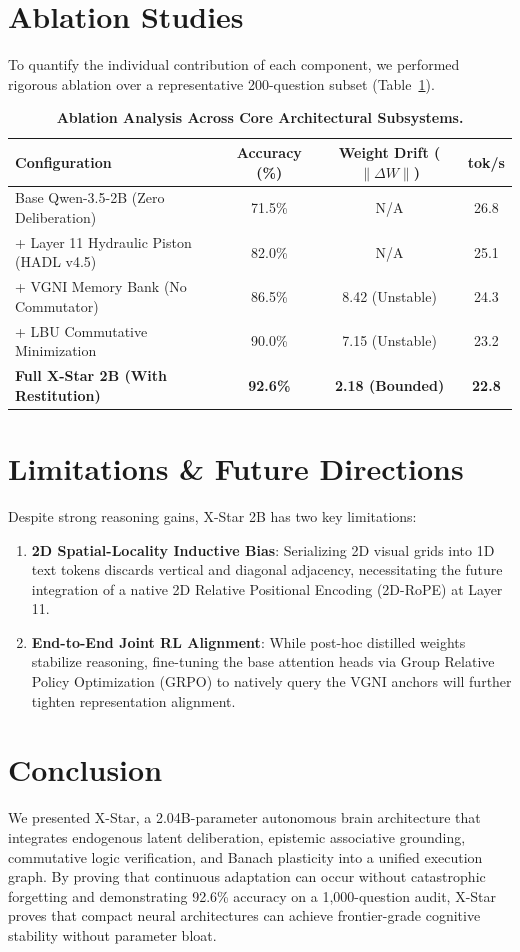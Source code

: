 \documentclass[11pt,a4paper]{article}
\begin{document}
\section{Ablation Studies}
To quantify the individual contribution of each component, we performed rigorous ablation over a representative 200-question subset (Table~\ref{tab:ablation}).

\begin{table}[h]
\centering
\caption{\textbf{Ablation Analysis Across Core Architectural Subsystems.}}
\label{tab:ablation}
\begin{tabular}{lccc}
\toprule
\textbf{Configuration} & \textbf{Accuracy (\%)} & \textbf{Weight Drift ($\|\Delta W\|$)} & \textbf{tok/s} \\
\midrule
Base Qwen-3.5-2B (Zero Deliberation) & 71.5\% & N/A & 26.8 \\
+ Layer 11 Hydraulic Piston (HADL v4.5) & 82.0\% & N/A & 25.1 \\
+ VGNI Memory Bank (No Commutator) & 86.5\% & 8.42 (Unstable) & 24.3 \\
+ LBU Commutative Minimization & 90.0\% & 7.15 (Unstable) & 23.2 \\
\textbf{Full X-Star 2B (With Restitution)} & \textbf{92.6\%} & \textbf{2.18 (Bounded)} & \textbf{22.8} \\
\bottomrule
\end{tabular}
\end{table}

\section{Limitations \& Future Directions}
Despite strong reasoning gains, X-Star 2B has two key limitations:
\begin{enumerate}
    \item \textbf{2D Spatial-Locality Inductive Bias}: Serializing 2D visual grids into 1D text tokens discards vertical and diagonal adjacency, necessitating the future integration of a native 2D Relative Positional Encoding (2D-RoPE) at Layer 11.
    \item \textbf{End-to-End Joint RL Alignment}: While post-hoc distilled weights stabilize reasoning, fine-tuning the base attention heads via Group Relative Policy Optimization (GRPO) to natively query the VGNI anchors will further tighten representation alignment.
\end{enumerate}

\section{Conclusion}
We presented X-Star, a 2.04B-parameter autonomous brain architecture that integrates endogenous latent deliberation, epistemic associative grounding, commutative logic verification, and Banach plasticity into a unified execution graph. By proving that continuous adaptation can occur without catastrophic forgetting and demonstrating 92.6\% accuracy on a 1,000-question audit, X-Star proves that compact neural architectures can achieve frontier-grade cognitive stability without parameter bloat.



\end{document}
